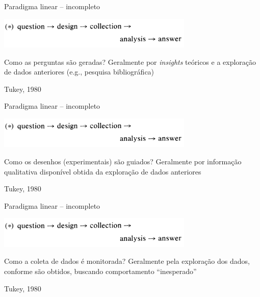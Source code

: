\documentclass{beamer}
\begin{document}
\begin{frame}{Paradigma linear -- incompleto}
  \begin{center}
    \includegraphics[width=0.7\textwidth]{EDA/eda-tukey1}
  \end{center}
  \bigskip
  \begin{block}{Como as perguntas são geradas?}
    \footnotesize
    Geralmente por {\em insights} teóricos e a exploração de dados anteriores (e.g., pesquisa bibliográfica)
  \end{block}

  \vfill
  \scriptsize
  \hfill Tukey, 1980
\end{frame}

\begin{frame}{Paradigma linear -- incompleto}
  \begin{center}
    \includegraphics[width=0.7\textwidth]{EDA/eda-tukey1}
  \end{center}
  \bigskip
  \begin{block}{Como os desenhos (experimentais) são guiados?}
    \footnotesize
    Geralmente por informação qualitativa disponível
    obtida da exploração de dados anteriores
\end{block}

  \vfill
  \scriptsize
  \hfill Tukey, 1980
\end{frame}

\begin{frame}{Paradigma linear -- incompleto}
  \begin{center}
    \includegraphics[width=0.7\textwidth]{EDA/eda-tukey1}
  \end{center}
  \bigskip
  \begin{block}{Como a coleta de dados é monitorada?}
    \footnotesize
    Geralmente pela exploração dos dados, conforme são obtidos, buscando
    comportamento ``inesperado''
  \end{block}

  \vfill
  \scriptsize
  \hfill Tukey, 1980
\end{frame}
\end{document}
